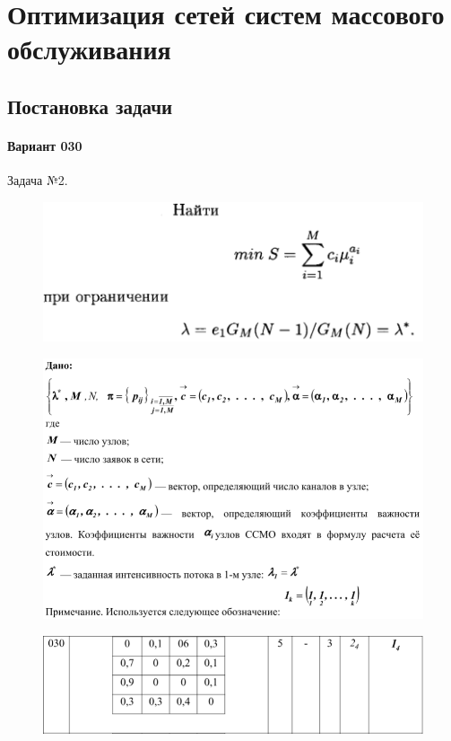 \chapter{Оптимизация сетей систем массового обслуживания}

\section{Постановка задачи}

\subsubsection{Вариант 030}

Задача №2.

\begin{figure}[h!]
	\centering
	\includegraphics[scale = 0.39]{images/p3_1.png}
	\label{image:p3_1}
\end{figure}

\begin{figure}[h!]
	\centering
	\includegraphics[scale = 0.59]{images/p3_2.png}
	\label{image:p3_2}
\end{figure}

\begin{figure}[h!]
	\centering
	\includegraphics[scale = 0.59]{images/p3_3.png}
	\label{image:p3_3}
\end{figure}

